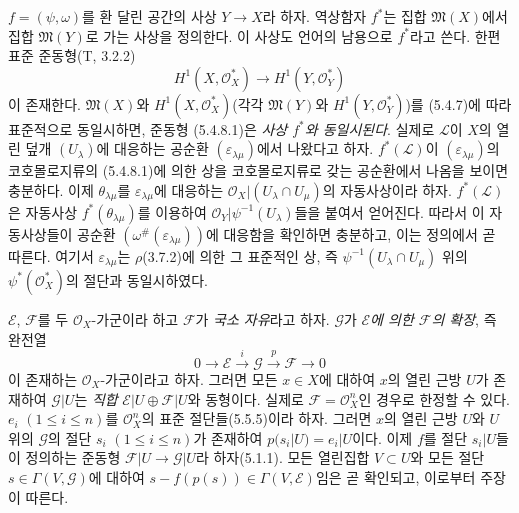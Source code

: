 \begin{env}[5.4.8]
\label{0.5.4.8-ko}
$f=(\psi,\omega)$를 환 달린 공간의 사상 $Y\to X$라 하자. 역상함자
$f^*$는 집합 $\mathfrak M(X)$에서 집합 $\mathfrak M(Y)$로 가는
사상을 정의한다. 이 사상도 언어의 남용으로 $f^*$라고 쓴다. 한편
표준 준동형(T, 3.2.2)
\[
  H^1(X,\mathcal O_X^*)\longrightarrow H^1(Y,\mathcal O_Y^*)
  \tag{5.4.8.1}\label{0.5.4.8.1-ko}
\]
이 존재한다. $\mathfrak M(X)$와 $H^1(X,\mathcal O_X^*)$(각각
$\mathfrak M(Y)$와 $H^1(Y,\mathcal O_Y^*)$)를 (5.4.7)에 따라
표준적으로 동일시하면, 준동형 (5.4.8.1)은 \emph{사상 $f^*$와
동일시된다}. 실제로 $\mathcal L$이 $X$의 열린 덮개
$(U_\lambda)$에 대응하는 공순환 $(\varepsilon_{\lambda\mu})$에서
나왔다고 하자. $f^*(\mathcal L)$이
$(\varepsilon_{\lambda\mu})$의 코호몰로지류의 (5.4.8.1)에 의한 상을
코호몰로지류로 갖는 공순환에서 나옴을 보이면 충분하다. 이제
$\theta_{\lambda\mu}$를 $\varepsilon_{\lambda\mu}$에 대응하는
$\mathcal O_X|(U_\lambda\cap U_\mu)$의 자동사상이라 하자.
$f^*(\mathcal L)$은 자동사상 $f^*(\theta_{\lambda\mu})$를 이용하여
$\mathcal O_Y|\psi^{-1}(U_\lambda)$들을 붙여서 얻어진다. 따라서 이
자동사상들이 공순환
$(\omega^\#(\varepsilon_{\lambda\mu}))$에 대응함을 확인하면 충분하고,
이는 정의에서 곧 따른다. 여기서 $\varepsilon_{\lambda\mu}$는
$\rho$(3.7.2)에 의한 그 표준적인 상, 즉
$\psi^{-1}(U_\lambda\cap U_\mu)$ 위의
$\psi^*(\mathcal O_X^*)$의 절단과 동일시하였다.
\end{env}

\begin{env}[5.4.9]
\label{0.5.4.9-ko}
$\mathcal E$, $\mathcal F$를 두 $\mathcal O_X$-가군이라 하고
$\mathcal F$가 \emph{국소 자유}라고 하자. $\mathcal G$가
\emph{$\mathcal E$에 의한 $\mathcal F$의 확장}, 즉 완전열
\[
  0\longrightarrow\mathcal E\xrightarrow{i}\mathcal G
  \xrightarrow{p}\mathcal F\longrightarrow0
\]
이 존재하는 $\mathcal O_X$-가군이라고 하자. 그러면 모든 $x\in X$에
대하여 $x$의 열린 근방 $U$가 존재하여 $\mathcal G|U$는
\emph{직합} $\mathcal E|U\oplus\mathcal F|U$와 동형이다. 실제로
$\mathcal F=\mathcal O_X^n$인 경우로 한정할 수 있다.
$e_i$ $(1\leq i\leq n)$를 $\mathcal O_X^n$의 표준 절단들(5.5.5)이라
하자. 그러면 $x$의 열린 근방 $U$와 $U$ 위의 $\mathcal G$의 절단
$s_i$ $(1\leq i\leq n)$가 존재하여 $p(s_i|U)=e_i|U$이다. 이제
$f$를 절단 $s_i|U$들이 정의하는 준동형
$\mathcal F|U\to\mathcal G|U$라 하자(5.1.1). 모든 열린집합
$V\subset U$와 모든 절단 $s\in\Gamma(V,\mathcal G)$에 대하여
$s-f(p(s))\in\Gamma(V,\mathcal E)$임은 곧 확인되고, 이로부터 주장이
따른다.
\end{env}

